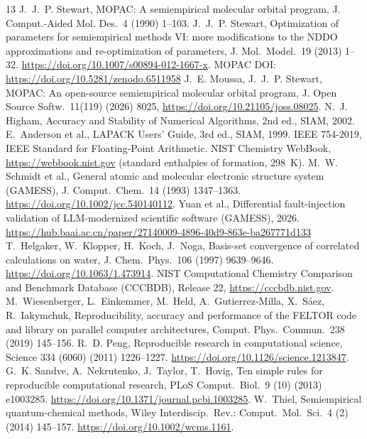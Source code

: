 \documentclass[preprint,12pt]{elsarticle}
\begin{document}
\begin{thebibliography}{13}
 J.~J.~P. Stewart, MOPAC: A semiempirical molecular orbital program, J. Comput.-Aided Mol. Des.\ 4 (1990) 1--103.
 J.~J.~P. Stewart, Optimization of parameters for semiempirical methods VI: more modifications to the NDDO approximations and re-optimization of parameters, J. Mol.\ Model.\ 19 (2013) 1--32. \url{https://doi.org/10.1007/s00894-012-1667-x}.
 MOPAC DOI: \url{https://doi.org/10.5281/zenodo.6511958}
 J.~E. Moussa, J.~J.~P. Stewart, MOPAC: An open-source semiempirical molecular orbital program, J. Open Source Softw.\ 11(119) (2026) 8025, \url{https://doi.org/10.21105/joss.08025}.
 N.~J. Higham, Accuracy and Stability of Numerical Algorithms, 2nd ed., SIAM, 2002.
 E.~Anderson et al., LAPACK Users' Guide, 3rd ed., SIAM, 1999.
 IEEE 754-2019, IEEE Standard for Floating-Point Arithmetic.
 NIST Chemistry WebBook, \url{https://webbook.nist.gov} (standard enthalpies of formation, 298~K).
 M.~W. Schmidt et al., General atomic and molecular electronic structure system (GAMESS), J. Comput.\ Chem.\ 14 (1993) 1347--1363. \url{https://doi.org/10.1002/jcc.540140112}.
 Yuan et al., Differential fault-injection validation of LLM-modernized scientific software (GAMESS), 2026. \url{https://hub.baai.ac.cn/paper/27140009-4896-40d9-863e-ba267771d133}
 T.~Helgaker, W.~Klopper, H.~Koch, J.~Noga, Basis-set convergence of correlated calculations on water, J. Chem.\ Phys.\ 106 (1997) 9639--9646. \url{https://doi.org/10.1063/1.473914}.
 NIST Computational Chemistry Comparison and Benchmark Database (CCCBDB), Release 22, \url{https://cccbdb.nist.gov}.
 M.~Wiesenberger, L.~Einkemmer, M.~Held, A.~Gutierrez-Milla, X.~S\'aez, R.~Iakymchuk, Reproducibility, accuracy and performance of the FELTOR code and library on parallel computer architectures, Comput. Phys.\ Commun.\ 238 (2019) 145--156.
 R.~D. Peng, Reproducible research in computational science, Science 334 (6060) (2011) 1226--1227. \url{https://doi.org/10.1126/science.1213847}.
 G.~K. Sandve, A.~Nekrutenko, J.~Taylor, T.~Hovig, Ten simple rules for reproducible computational research, PLoS Comput.\ Biol.\ 9 (10) (2013) e1003285. \url{https://doi.org/10.1371/journal.pcbi.1003285}.
 W.~Thiel, Semiempirical quantum-chemical methods, Wiley Interdiscip.\ Rev.: Comput.\ Mol.\ Sci.\ 4 (2) (2014) 145--157. \url{https://doi.org/10.1002/wcms.1161}.

\end{thebibliography}
\end{document}
